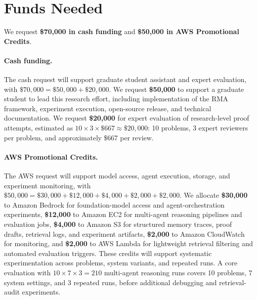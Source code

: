 \documentclass[11pt]{article}
\begin{document}
\section*{Funds Needed}
\vspace{-4pt}
We request \textbf{\$70,000 in cash funding} and \textbf{\$50,000 in AWS Promotional Credits}.

\vspace{-4pt}
\paragraph{Cash funding.}
\vspace{-4pt}
The cash request will support graduate student assistant and expert evaluation, with $\$70{,}000=\$50{,}000+\$20{,}000$. We request \textbf{\$50,000} to support a graduate student to lead this research effort, including implementation of the RMA framework, experiment execution, open-source release, and technical documentation. 
We request \textbf{\$20,000} for expert evaluation of research-level proof attempts, estimated as $10 \times 3 \times \$667 \approx \$20{,}000$: 10 problems, 3 expert reviewers per problem, and approximately \$667 per review.

\vspace{-6pt}
\paragraph{AWS Promotional Credits.}
The AWS request will support model access, agent execution, storage, and experiment monitoring, with $\$50{,}000=\$30{,}000+\$12{,}000+\$4{,}000+\$2{,}000+\$2{,}000$. We allocate \textbf{\$30,000} to Amazon Bedrock for foundation-model access and agent-orchestration experiments, \textbf{\$12,000} to Amazon EC2 for multi-agent reasoning pipelines and evaluation jobs, \textbf{\$4,000} to Amazon S3 for structured memory traces, proof drafts, retrieval logs, and experiment artifacts, \textbf{\$2,000} to Amazon CloudWatch for monitoring, and \textbf{\$2,000} to AWS Lambda for lightweight retrieval filtering and automated evaluation triggers. These credits will support systematic experimentation across problems, system variants, and repeated runs. A core evaluation with $10 \times 7 \times 3 = 210$ multi-agent reasoning runs covers 10 problems, 7 system settings, and 3 repeated runs, before additional debugging and retrieval-audit experiments.
\end{document}

